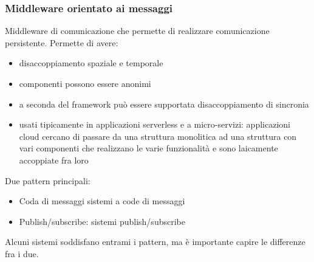 \documentclass{article}
\begin{document}
\subsubsection{Middleware orientato ai messaggi}
Middleware di comunicazione che permette di realizzare comunicazione persistente. Permette di avere:
\begin{itemize}
\item disaccoppiamento spaziale e temporale
\item componenti possono essere anonimi
\item a seconda del framework può essere supportata disaccoppiamento di sincronia
\item usati tipicamente in applicazioni serverless e a micro-servizi: applicazioni cloud cercano di passare da una struttura monolitica ad una struttura con vari componenti che realizzano le varie funzionalità e sono laicamente accoppiate fra loro
\end{itemize}
Due pattern principali:
\begin{itemize}
\item Coda di messaggi sistemi a code di messaggi
\item Publish/subscribe: sistemi publish/subscribe
\end{itemize}
Alcuni sistemi soddisfano entrami i pattern, ma è importante capire le differenze fra i due.
\end{document}
